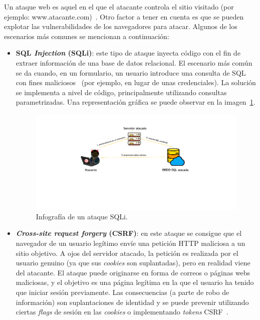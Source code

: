 Un ataque web es aquel en el que el atacante controla el sitio visitado (por ejemplo: www.atacante.com)~\cite{apuntesCybersec}. Otro factor a tener en cuenta es que se pueden explotar las vulnerabilidades de los navegadores para atacar. Algunos de los escenarios más comunes se mencionan a continuación:

\begin{itemize}
	\item \textbf{SQL \textit{Injection} (SQLi)}: este tipo de ataque inyecta código con el fin de extraer información de una base de datos relacional. El escenario más común se da cuando, en un formulario, un usuario introduce una consulta de SQL con fines maliciosos~\cite{sqlIw3school} (por ejemplo, en lugar de unas credenciales). La solución se implementa a nivel de código, principalmente utilizando consultas parametrizadas. Una representación gráfica se puede observar en la imagen~\ref{img:sqli}.
	
\begin{figure}[h]
	\caption[Ataques web: SQLi]{Infografía de un ataque SQLi.}
	\label{img:sqli}
	\centering
	\includegraphics[scale=0.5]{../img/memoria/3_sqli}
\end{figure}

	\item \textbf{\textit{Cross-site request forgery} (CSRF)}: en este ataque se consigue que el navegador de un usuario legítimo envíe una petición HTTP maliciosa a un sitio objetivo. A ojos del servidor atacado, la petición es realizada por el usuario genuino (ya que sus \textit{cookies} son suplantadas), pero en realidad viene del atacante. El ataque puede originarse en forma de correos o páginas webs maliciosas, y el objetivo es una página legítima en la que el usuario ha tenido que iniciar sesión previamente. Las consecuencias (a parte de robo de información) son suplantaciones de identidad y se puede prevenir utilizando ciertas \textit{flags} de sesión en las \textit{cookies} o implementando \textit{tokens} CSRF~\cite{csrfatatus}.
	

\end{itemize}
